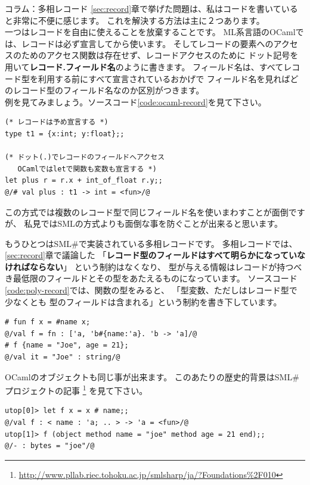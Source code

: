 \documentclass[11pt,a4paper]{article}
\begin{document}
\begin{itembox}[l]{コラム：多相レコード}
  \ref{sec:record}章で挙げた問題は、私はコードを書いていると非常に不便に感じます。
  これを解決する方法は主に２つあります。\\
  一つはレコードを自由に使えることを放棄することです。
  ML系言語のOCaml\cite{ocaml}では、レコードは必ず宣言してから使います。
  そしてレコードの要素へのアクセスのためのアクセス関数は存在せず、レコードアクセスのために
  ドット記号を用いて\textbf{レコード.フィールド名}のように書きます。
  フィールド名は、すべてレコード型を利用する前にすべて宣言されているおかげで
  フィールド名を見ればどのレコード型のフィールド名なのか区別がつきます。\\
  例を見てみましょう。ソースコード\ref{code:ocaml-record}を見て下さい。

\begin{lstlisting}[caption=OCamlにおけるレコード,label=code:ocaml-record]
(* レコードは予め宣言する *)
type t1 = {x:int; y:float};;

(* ドット(.)でレコードのフィールドへアクセス
   OCamlではletで関数も変数も宣言する *)
let plus r = r.x + int_of_float r.y;;
@/# val plus : t1 -> int = <fun>/@
\end{lstlisting}

  この方式では複数のレコード型で同じフィールド名を使いまわすことが面倒ですが、
  私見ではSMLの方式よりも面倒な事を防ぐことが出来ると思います。

  もうひとつはSML\#\cite{smlsharp}で実装されている多相レコードです。
  多相レコードでは、\ref{sec:record}章で議論した
 「\textbf{レコード型のフィールドはすべて明らかになっていなければならない}」
  という制約はなくなり、
  型が与える情報はレコードが持つべき最低限のフィールドとその型をあたえるものになっています。
  ソースコード\ref{code:poly-record}では、関数の型をみると、
  「型変数、ただしはレコード型で少なくとも
  型のフィールドは含まれる」という制約を書き下しています。

\begin{lstlisting}[caption=SML\#の多相レコード,label=code:poly-record]
# fun f x = #name x;
@/val f = fn : ['a, 'b#{name:'a}. 'b -> 'a]/@
# f {name = "Joe", age = 21};
@/val it = "Joe" : string/@
\end{lstlisting}

  OCamlのオブジェクトも同じ事が出来ます。
  このあたりの歴史的背景はSML\#プロジェクトの記事  \footnote{\url{http://www.pllab.riec.tohoku.ac.jp/smlsharp/ja/?Foundations\%2F010}}
  を見て下さい。

\begin{lstlisting}[caption=OCamlのオブジェクト,label=code:ocaml-obj]
utop[0]> let f x = x # name;;
@/val f : < name : 'a; .. > -> 'a = <fun>/@
utop[1]> f (object method name = "joe" method age = 21 end);;
@/- : bytes = "joe"/@
\end{lstlisting}

\end{itembox}
\end{document}
